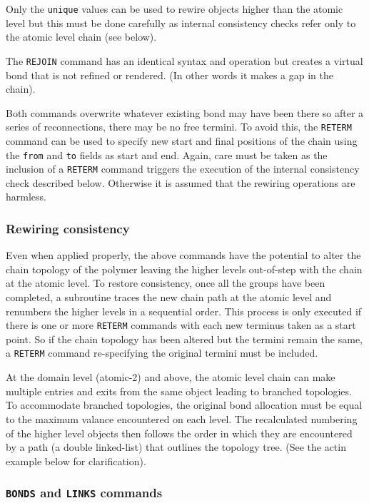 Only the {\tt unique} values can be used to rewire objects higher than the atomic level but this
must be done carefully as internal consistency checks refer only to the atomic level chain (see below).

The {\tt REJOIN} command has an identical syntax and operation but creates a virtual bond that is
not refined or rendered. (In other words it makes a gap in the chain).

Both commands overwrite whatever existing bond may have been there so after a series of reconnections,
there may be no free termini.  To avoid this, the {\tt RETERM} command can be used to specify new
start and final positions of the chain using the {\tt from} and {\tt to} fields as start and end.
Again, care must be taken as the inclusion of a {\tt RETERM}
command triggers the execution of the internal consistency check described below.  Otherwise it
is assumed that the rewiring operations are harmless. 

\subsubsection{Rewiring consistency}

Even when applied properly, the above commands have the potential to alter the chain topology
of the polymer leaving the higher levels out-of-step with the chain at the atomic level.
To restore consistency, once all the groups have been completed, a subroutine traces the new
chain path at the atomic level and renumbers the higher levels in a sequential order.
This process is only executed if there is one or more {\tt RETERM} commands with each new
terminus taken as a start point.  So if the chain topology has been altered but the termini
remain the same, a {\tt RETERM} command re-specifying the original termini must be included.

At the domain level (atomic-2) and above, the atomic level chain can make multiple
entries and exits from the same object leading to branched topologies.
To accommodate branched topologies, the original bond allocation must be equal to the maximum
valance encountered on each level.   The recalculated numbering of the higher level objects then 
follows the order in which they are encountered by a path (a double linked-list) that outlines 
the topology tree.  (See the actin example below for clarification). 

\subsubsection{{\tt BONDS} and {\tt LINKS} commands}

